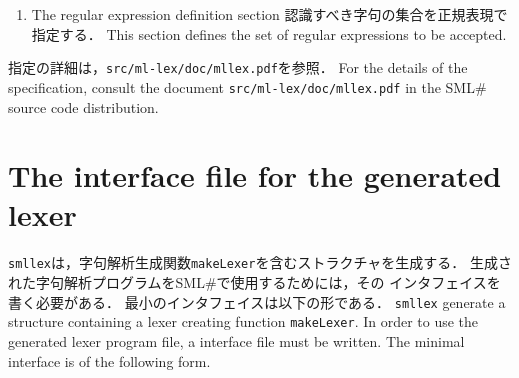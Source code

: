 \documentclass{jbook}
\newcommand{\txt}[2]{#2}
\newcommand{\smlsharp}{SML\#}
\newcommand{\code}[1]{\mbox{\large\tt #1}}
\begin{document}
\begin{enumerate}
\begin{itemize}
\end{itemize}
	
\item \txt{正規言語セクション}{The regular expression definition section}
\ifjp%
	認識すべき字句の集合を正規表現で指定する．
\else%
	This section defines the set of regular expressions to be accepted.
\fi%
\end{enumerate}

\ifjp%
	指定の詳細は，\code{src/ml-lex/doc/mllex.pdf}を参照．
\else%
	For the details of the specification, consult the document 
\code{src/ml-lex/doc/mllex.pdf} in the \smlsharp{} source code distribution.
\fi%

\section{\txt{smllex出力ファイルのインタフェイスファル記述}{The interface file for the generated lexer}}
\ifjp%
	\code{smllex}は，字句解析生成関数\code{makeLexer}を含むストラクチャを生成する．
	生成された字句解析プログラムを\smlsharp{}で使用するためには，その
インタフェイスを書く必要がある．
	最小のインタフェイスは以下の形である．
\else%
	\code{smllex} generate a structure containing a lexer creating function
\code{makeLexer}.
	In order to use the generated lexer program file, a 
interface file must be written.
	The minimal interface is of the following form.
\fi%
\end{document}
